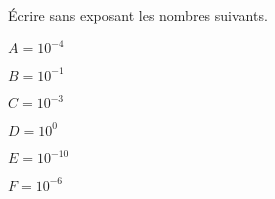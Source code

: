 
Écrire sans exposant les nombres suivants.

\begin{enumerate}
\begin{minipage}{0.49\linewidth}
\item $A=10^{-4}$
\item $B=10^{-1} $
\item $C=10^{-3} $ 
\end{minipage}
\hfill
\begin{minipage}{0.49\linewidth}
\item $D=10^{0}$
\item $E=10^{-10}$ 
\item $F=10^{-6}$ 
\end{minipage}
\end{enumerate}